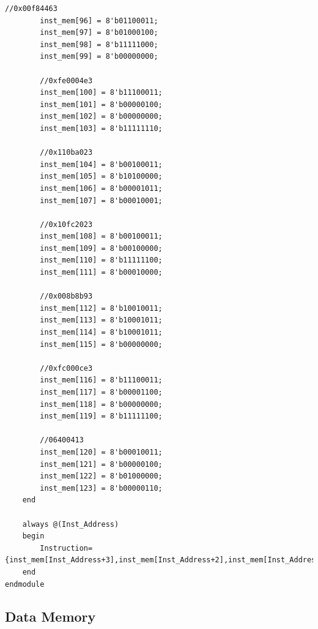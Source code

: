 \documentclass{article}
\begin{document}
\begin{lstlisting}[caption={Changes to Instruction Memory}, captionpos=b, language=RISC-V]
        //0x00f84463
        inst_mem[96] = 8'b01100011;
        inst_mem[97] = 8'b01000100;
        inst_mem[98] = 8'b11111000;
        inst_mem[99] = 8'b00000000;
        
        //0xfe0004e3
        inst_mem[100] = 8'b11100011;
        inst_mem[101] = 8'b00000100;
        inst_mem[102] = 8'b00000000;
        inst_mem[103] = 8'b11111110;
        
        //0x110ba023
        inst_mem[104] = 8'b00100011;
        inst_mem[105] = 8'b10100000;
        inst_mem[106] = 8'b00001011;
        inst_mem[107] = 8'b00010001;
        
        //0x10fc2023
        inst_mem[108] = 8'b00100011;
        inst_mem[109] = 8'b00100000;
        inst_mem[110] = 8'b11111100;
        inst_mem[111] = 8'b00010000;
        
        //0x008b8b93
        inst_mem[112] = 8'b10010011;
        inst_mem[113] = 8'b10001011;
        inst_mem[114] = 8'b10001011;
        inst_mem[115] = 8'b00000000;
        
        //0xfc000ce3
        inst_mem[116] = 8'b11100011;
        inst_mem[117] = 8'b00001100;
        inst_mem[118] = 8'b00000000;
        inst_mem[119] = 8'b11111100;

        //06400413
        inst_mem[120] = 8'b00010011;
        inst_mem[121] = 8'b00000100;
        inst_mem[122] = 8'b01000000;
        inst_mem[123] = 8'b00000110;
	end
	
	always @(Inst_Address)
	begin
		Instruction={inst_mem[Inst_Address+3],inst_mem[Inst_Address+2],inst_mem[Inst_Address+1],inst_mem[Inst_Address]};
	end
endmodule
\end{lstlisting}


\subsection{Data Memory}
\end{document}
